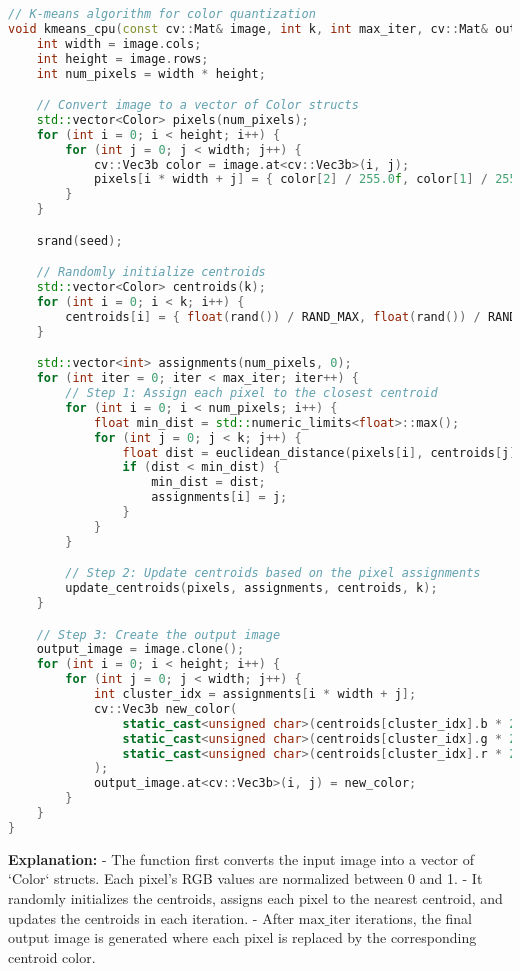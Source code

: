 \begin{lstlisting}[language=C++]
// K-means algorithm for color quantization
void kmeans_cpu(const cv::Mat& image, int k, int max_iter, cv::Mat& output_image,int seed) {
    int width = image.cols;
    int height = image.rows;
    int num_pixels = width * height;

    // Convert image to a vector of Color structs
    std::vector<Color> pixels(num_pixels);
    for (int i = 0; i < height; i++) {
        for (int j = 0; j < width; j++) {
            cv::Vec3b color = image.at<cv::Vec3b>(i, j);
            pixels[i * width + j] = { color[2] / 255.0f, color[1] / 255.0f, color[0] / 255.0f };
        }
    }

    srand(seed);

    // Randomly initialize centroids
    std::vector<Color> centroids(k);
    for (int i = 0; i < k; i++) {
        centroids[i] = { float(rand()) / RAND_MAX, float(rand()) / RAND_MAX, float(rand()) / RAND_MAX };
    }

    std::vector<int> assignments(num_pixels, 0);
    for (int iter = 0; iter < max_iter; iter++) {
        // Step 1: Assign each pixel to the closest centroid
        for (int i = 0; i < num_pixels; i++) {
            float min_dist = std::numeric_limits<float>::max();
            for (int j = 0; j < k; j++) {
                float dist = euclidean_distance(pixels[i], centroids[j]);
                if (dist < min_dist) {
                    min_dist = dist;
                    assignments[i] = j;
                }
            }
        }

        // Step 2: Update centroids based on the pixel assignments
        update_centroids(pixels, assignments, centroids, k);
    }

    // Step 3: Create the output image
    output_image = image.clone();
    for (int i = 0; i < height; i++) {
        for (int j = 0; j < width; j++) {
            int cluster_idx = assignments[i * width + j];
            cv::Vec3b new_color(
                static_cast<unsigned char>(centroids[cluster_idx].b * 255),
                static_cast<unsigned char>(centroids[cluster_idx].g * 255),
                static_cast<unsigned char>(centroids[cluster_idx].r * 255)
            );
            output_image.at<cv::Vec3b>(i, j) = new_color;
        }
    }
}
\end{lstlisting}

\textbf{Explanation:}
- The function first converts the input image into a vector of `Color` structs. Each pixel’s RGB values are normalized between 0 and 1.
- It randomly initializes the centroids, assigns each pixel to the nearest centroid, and updates the centroids in each iteration.
- After \( \text{max\_iter} \) iterations, the final output image is generated where each pixel is replaced by the corresponding centroid color.

